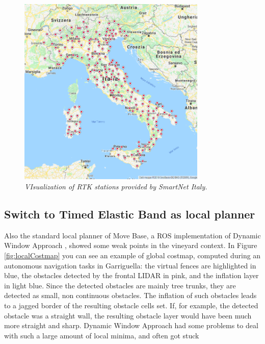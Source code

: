 \begin{figure}
	\centering
	\includegraphics[width=0.8\textwidth]{Images/localization/rtkItaly.png}
	\caption{\textit{VIsualization of RTK stations provided by SmartNet Italy.}}
	\label{fig:rtkItaly}
\end{figure}

\subsection{Switch to Timed Elastic Band as local planner}
Also the standard local planner of Move Base, a \ac{ROS} implementation of Dynamic Window Approach \parencite{dwa}, showed some weak points in the vineyard context. In Figure \ref{fig:localCostmap} you can see an example of global costmap, computed during an autonomous navigation tasks in Garriguella: the virtual fences are highlighted in blue, the obstacles detected by the frontal \ac{LIDAR} in pink, and the inflation layer in light blue. Since the detected obstacles are mainly tree trunks, they are detected as small, non continuous obstacles. The inflation of such obstacles leads to a jagged border of the resulting obstacle cells set. If, for example, the detected obstacle was a straight wall, the resulting obstacle layer would have been much more straight and sharp. Dynamic Window Approach had some problems to deal with such a large amount of local minima, and often got stuck 

